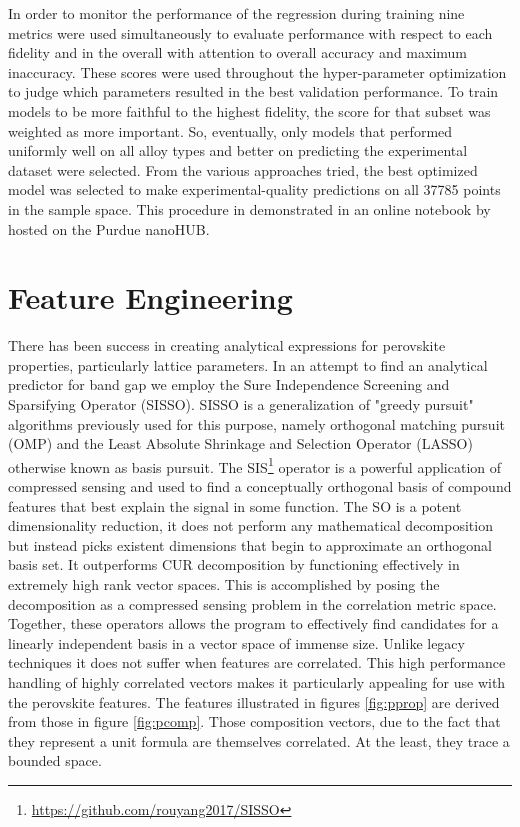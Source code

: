 In order to monitor the performance of the regression during training nine metrics were used simultaneously to evaluate performance with respect to each fidelity and in the overall with attention to overall accuracy and maximum inaccuracy.
These scores were used throughout the hyper-parameter optimization to judge which parameters resulted in the best validation performance.
To train models to be more faithful to the highest fidelity, the score for that subset was weighted as more important.
So, eventually, only models that performed uniformly well on all alloy types and better on predicting the experimental dataset were selected.
From the various approaches tried, the best optimized model was selected to make experimental-quality predictions on all 37785 points in the sample space.
This procedure in demonstrated in an online notebook by \textcite{manganaris-2022-mrs-comput} hosted on the Purdue nanoHUB.

\section{Feature Engineering}
\label{sec:orgeb8814f}
There has been success in creating analytical expressions for perovskite properties, particularly lattice parameters.
\autocite{jiang-2006-predic-lattic}
In an attempt to find an analytical predictor for band gap we employ the Sure Independence Screening and Sparsifying Operator (SISSO).
\autocite{ouyang-2018-sisso} 
SISSO is a generalization of "greedy pursuit" algorithms previously used for this purpose, namely orthogonal matching pursuit (OMP) and the Least Absolute Shrinkage and Selection Operator (LASSO) otherwise known as basis pursuit.
\autocite{tibshirani-1996-regres-shrin}
The SIS\footnote{\url{https://github.com/rouyang2017/SISSO}} operator is a powerful application of compressed sensing and used to find a conceptually orthogonal basis of compound features that best explain the signal in some function.
\autocite{ghiringhelli-2017-learn-physic}
The SO is a potent dimensionality reduction, it does not perform any mathematical decomposition but instead picks existent dimensions that begin to approximate an orthogonal basis set.
It outperforms CUR decomposition by functioning effectively in extremely high rank vector spaces.
\autocite{ray-2021-various-dimen,hamm-2019-cur-decom}
This is accomplished by posing the decomposition as a compressed sensing problem in the correlation metric space.
Together, these operators allows the program to effectively find candidates for a linearly independent basis in a vector space of immense size.
Unlike legacy techniques it does not suffer when features are correlated.
\autocite{tibshirani-1996-regres-shrin,gauraha-2018-introd-to-lasso}
This high performance handling of highly correlated vectors makes it particularly appealing for use with the perovskite features.
The features illustrated in figures \ref{fig:pprop} are derived from those in figure \ref{fig:pcomp}.
Those composition vectors, due to the fact that they represent a unit formula are themselves correlated.
At the least, they trace a bounded space.

